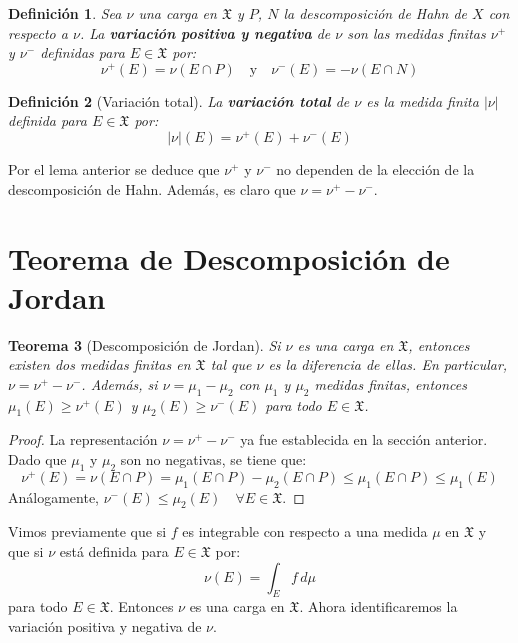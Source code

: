 \documentclass[12pt,a4paper]{article}
\theoremstyle{profesional}
\newtheorem{teorema}{Teorema}[section]
\theoremstyle{definicion-style}
\newtheorem{definicion}[teorema]{Definición}
\newcommand{\X}{\mathfrak{X}}
\begin{document}
\begin{definicion}
    Sea \( \nu \) una carga en \( \X \) y \( P \), \( N \) la descomposición de Hahn de \( X \) con respecto a \( \nu \).
    La \textbf{variación positiva y negativa} de \( \nu \) son las medidas finitas \( \nu^+ \) y \( \nu^- \) definidas para \( E \in \X \) por:
    \[
        \nu^+(E) = \nu(E \cap P) \quad \text{y} \quad \nu^-(E) = -\nu(E \cap N)
    \]
\end{definicion}

\begin{definicion}[Variación total]
    La \textbf{variación total} de \( \nu \) es la medida finita \( |\nu| \) definida para \( E \in \X \) por:
    \[
        |\nu|(E) = \nu^+(E) + \nu^-(E)
    \]
\end{definicion}

Por el lema anterior se deduce que \( \nu^+ \) y \( \nu^- \) no dependen de la elección de la descomposición de Hahn. Además, es claro que \( \nu = \nu^+ - \nu^- \).

\section{Teorema de Descomposición de Jordan}

\begin{teorema}[Descomposición de Jordan]
    Si \( \nu \) es una carga en \( \X \), entonces existen dos medidas finitas en \( \X \) tal que \( \nu \) es la diferencia de ellas. En particular,
    \( \nu = \nu^+ - \nu^- \). Además, si \( \nu = \mu_1 - \mu_2 \) con \( \mu_1 \) y \( \mu_2 \) medidas finitas, entonces \( \mu_1(E) \geq \nu^+(E) \) y \( \mu_2(E) \geq \nu^-(E) \) para todo \( E \in \X \).
\end{teorema}
\begin{proof}
    La representación \( \nu = \nu^+ - \nu^- \) ya fue establecida en la sección anterior. Dado que \( \mu_1 \) y \( \mu_2 \) son no negativas, se tiene que:
    \[
        \nu^+(E) = \nu(E \cap P) = \mu_1(E \cap P) - \mu_2(E \cap P) \leq \mu_1(E \cap P) \leq \mu_1(E)
    \]
    Análogamente, \( \nu^-(E) \leq \mu_2(E) \quad \forall E \in \X \).
\end{proof}

Vimos previamente que si \( f \) es integrable con respecto a una medida \( \mu \) en \( \X \) y que si \( \nu \) está definida para \( E \in \X \) por:
\[
    \nu(E) = \int_E f \, d\mu
\]
para todo \( E \in \X \). Entonces \( \nu \) es una carga en \( \X \). Ahora identificaremos la variación positiva y negativa de \( \nu \).
\end{document}
